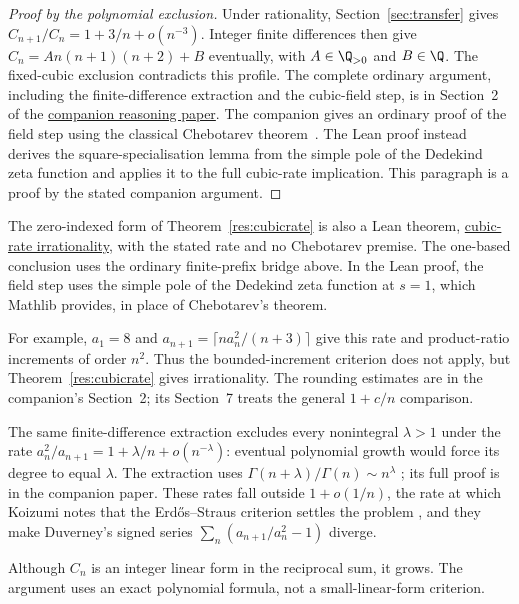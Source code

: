\documentclass[11pt]{article}
\newcommand{\latecommit}{7380b7871687b6bcc41ca0143c61f232e8af6500}
\newcommand{\laterepobase}{https://github.com/wcook04/plectis-erdos/blob/\latecommit}
\begin{document}
\begin{proof}[Proof by the polynomial exclusion]
Under rationality, Section~\ref{sec:transfer} gives
$C_{n+1}/C_n=1+3/n+o(n^{-3})$. Integer finite differences then give
$C_n=An(n+1)(n+2)+B$ eventually, with $A\in\Q_{>0}$ and $B\in\Q$.
The fixed-cubic exclusion contradicts this profile. The complete ordinary
argument, including the finite-difference extraction and the cubic-field
step, is in Section~2 of the
\href{https://wcook04.github.io/plectis/papers/erdos243-reciprocal-tail-reasoning-surface.pdf}{companion reasoning paper}.
The companion gives an ordinary proof of the field step using the classical
Chebotarev theorem~\cite[Section~3, author version]{stevenhagenlenstra1996}.
The Lean proof instead derives the square-specialisation lemma from the simple
pole of the Dedekind zeta function and applies it to the full cubic-rate
implication. This paragraph is a proof by the stated companion argument.
\end{proof}

\noindent The zero-indexed form of Theorem~\ref{res:cubicrate} is also a Lean theorem,
\href{\laterepobase/lean/ErdosProblems/Erdos243/PaperCompleteR21/SquareSpecialisationUnconditional.lean\#L70}{cubic-rate irrationality},
with the stated rate and no Chebotarev premise. The one-based conclusion uses the ordinary finite-prefix bridge above. In the Lean proof, the field
step uses the simple pole of the Dedekind zeta function at $s=1$, which
Mathlib provides, in place of Chebotarev's theorem.

For example, $a_1=8$ and $a_{n+1}=\lceil n a_n^2/(n+3)\rceil$
give this rate and product-ratio increments of order $n^2$. Thus the
bounded-increment criterion does not apply, but
Theorem~\ref{res:cubicrate} gives irrationality. The rounding estimates
are in the companion's Section~2; its Section~7 treats the general
$1+c/n$ comparison.

The same finite-difference extraction excludes every nonintegral
$\lambda>1$ under the rate
$a_n^2/a_{n+1}=1+\lambda/n+o(n^{-\lambda})$: eventual polynomial growth
would force its degree to equal $\lambda$. The extraction uses
$\Gamma(n+\lambda)/\Gamma(n)\sim n^\lambda$
\cite[5.11.12]{dlmf_gamma}; its full proof is in the companion paper.
These rates fall outside $1+o(1/n)$, the rate at which
Koizumi notes that the Erd\H{o}s--Straus criterion settles the problem \cite[Remark~3, p.~16]{koizumi2025}, and they make
Duverney's signed series $\sum_n(a_{n+1}/a_n^{2}-1)$ diverge.

Although $C_n$ is an integer linear form in the reciprocal sum, it grows.
The argument uses an exact polynomial formula, not a small-linear-form
criterion.
\end{document}
